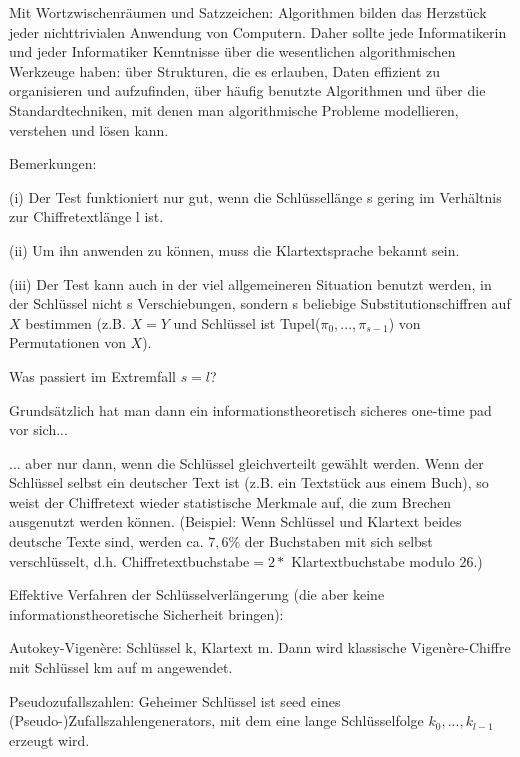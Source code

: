\documentclass[a4paper]{article}
\begin{document}
\begin{multicols}{3}
    Mit Wortzwischenräumen und Satzzeichen:
    Algorithmen bilden das Herzstück jeder nichttrivialen Anwendung von Computern. Daher sollte jede Informatikerin und jeder Informatiker Kenntnisse über die wesentlichen algorithmischen Werkzeuge haben: über Strukturen, die es erlauben, Daten effizient zu organisieren und aufzufinden, über häufig benutzte Algorithmen und über die Standardtechniken, mit denen man algorithmische Probleme modellieren, verstehen und lösen kann.

    Bemerkungen:
    \begin{itemize*}
        \item (i) Der Test funktioniert nur gut, wenn die Schlüssellänge s gering im Verhältnis zur Chiffretextlänge l ist.
        \item (ii) Um ihn anwenden zu können, muss die Klartextsprache bekannt sein.
        \item (iii) Der Test kann auch in der viel allgemeineren Situation benutzt werden, in der Schlüssel nicht s Verschiebungen, sondern s beliebige Substitutionschiffren auf $X$ bestimmen (z.B. $X=Y$ und Schlüssel ist Tupel($\pi_0,...,\pi_{s-1}$) von Permutationen von $X$).
    \end{itemize*}

    Was passiert im Extremfall $s=l$?
    \begin{itemize*}
        \item Grundsätzlich hat man dann ein informationstheoretisch sicheres one-time pad vor sich...
        \item ... aber nur dann, wenn die Schlüssel gleichverteilt gewählt werden.  Wenn der Schlüssel selbst ein deutscher Text ist (z.B. ein Textstück aus einem Buch), so weist der Chiffretext wieder statistische Merkmale auf, die zum Brechen ausgenutzt werden können. (Beispiel: Wenn Schlüssel und Klartext beides deutsche Texte sind, werden ca. $7,6\%$ der Buchstaben mit sich selbst verschlüsselt, d.h. Chiffretextbuchstabe$= 2 *$ Klartextbuchstabe modulo 26.)
    \end{itemize*}

    Effektive Verfahren der Schlüsselverlängerung (die aber keine informationstheoretische Sicherheit bringen):
    \begin{itemize*}
        \item Autokey-Vigenère: Schlüssel k, Klartext m. Dann wird klassische Vigenère-Chiffre mit Schlüssel km auf m angewendet.
        \item Pseudozufallszahlen: Geheimer Schlüssel ist seed eines (Pseudo-)Zufallszahlengenerators, mit dem eine lange Schlüsselfolge $k_0,...,k_{l-1}$ erzeugt wird.
    \end{itemize*}


\end{multicols}
\end{document}
